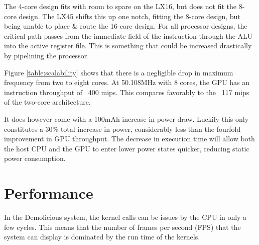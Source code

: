 \documentclass[../main/report.tex]{subfiles}
\begin{document}
The 4-core design fits with room to spare on the LX16, but does not fit the 8-core design.
The LX45 shifts this up one notch, fitting the 8-core design, but being unable to place \& route the 16-core design.
For all processor designs, the critical path passes from the immediate field of the instruction through the ALU into the active register file.
This is something that could be increased drastically by pipelining the processor.

Figure \ref{table:scalability} shows that there is a negligible drop in maximum frequency from two to eight cores.
At 50.108MHz with 8 cores, the GPU has an instruction throughput of ~400 mips.
This compares favorably to the ~117 mips of the two-core architecture.

It does however come with a 100mAh increase in power draw.
Luckily this only constitutes a 30\% total increase in power, considerably less than the fourfold improvement in GPU throughput.
The decrease in execution time will allow both the host CPU and the GPU to enter lower power states quicker, reducing static power consumption.

\section{Performance}

In the Demolicious system, the kernel calls can be issues by the CPU in only a few cycles.
This means that the number of frames per second (FPS) that the system can display is dominated by the run time of the kernels.
\end{document}
